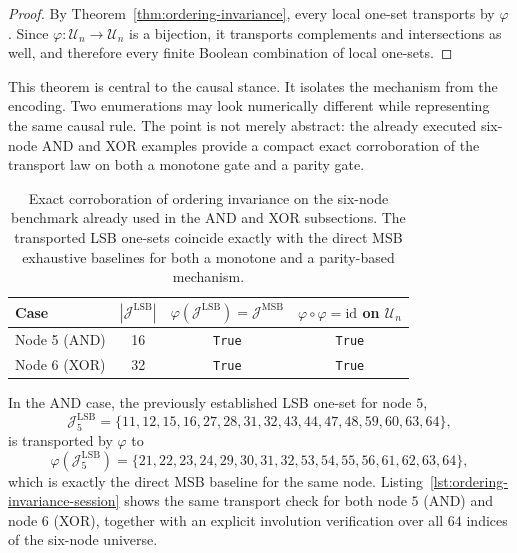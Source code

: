 \documentclass[11pt]{article}
\theoremstyle{definition}
\newcommand{\U}{\mathcal{U}_n}
\newcommand{\J}{\mathcal{J}}
\begin{document}
\begin{proof}
By Theorem~\ref{thm:ordering-invariance}, every local one-set transports by \(\varphi\). Since \(\varphi:\U\to\U\) is a bijection, it transports complements and intersections as well, and therefore every finite Boolean combination of local one-sets.
\end{proof}

This theorem is central to the causal stance. It isolates the mechanism from the encoding. Two enumerations may look numerically different while representing the same causal rule. The point is not merely abstract: the already executed six-node AND and XOR examples provide a compact exact corroboration of the transport law on both a monotone gate and a parity gate.

\begin{table}[t]
\centering
\setlength{\tabcolsep}{6pt}
\scriptsize
\begin{tabular}{@{}lccc@{}}
\toprule
Case & \(|\J^{\mathrm{LSB}}|\) & \(\varphi(\J^{\mathrm{LSB}})=\J^{\mathrm{MSB}}\) & \(\varphi\circ\varphi=\mathrm{id}\) on \(\U\) \\
\midrule
Node 5 (AND) & 16 & \texttt{True} & \texttt{True} \\
Node 6 (XOR) & 32 & \texttt{True} & \texttt{True} \\
\bottomrule
\end{tabular}
\caption{Exact corroboration of ordering invariance on the six-node benchmark already used in the AND and XOR subsections. The transported LSB one-sets coincide exactly with the direct MSB exhaustive baselines for both a monotone and a parity-based mechanism.}
\label{tab:ordering-invariance-summary}
\end{table}

In the AND case, the previously established LSB one-set for node \(5\),
\[
\J_{5}^{\mathrm{LSB}}=
\{11,12,15,16,27,28,31,32,43,44,47,48,59,60,63,64\},
\]
is transported by \(\varphi\) to
\[
\varphi(\J_{5}^{\mathrm{LSB}})
=
\{21,22,23,24,29,30,31,32,53,54,55,56,61,62,63,64\},
\]
which is exactly the direct MSB baseline for the same node. Listing~\ref{lst:ordering-invariance-session} shows the same transport check for both node \(5\) (AND) and node \(6\) (XOR), together with an explicit involution verification over all \(64\) indices of the six-node universe.
\end{document}
